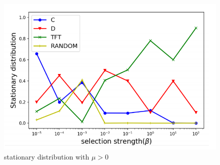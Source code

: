 \documentclass{article}
\begin{document}
\begin{figure}[h]
  \centering
  \includegraphics[scale=0.35]{figures/stationary-mu5-moran.png}
  \caption{stationary distribution with $\mu > 0$}
  \label{fig:stationary-mu5-moran}
\end{figure}
\end{document}
